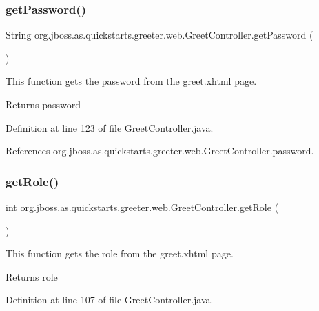 \subsubsection{\texorpdfstring{get\+Password()}{getPassword()}}
{\footnotesize\ttfamily String org.\+jboss.\+as.\+quickstarts.\+greeter.\+web.\+Greet\+Controller.\+get\+Password (\begin{DoxyParamCaption}{ }\end{DoxyParamCaption})}



This function gets the password from the greet.\+xhtml page. 

\begin{DoxyReturn}{Returns}
password 
\end{DoxyReturn}


Definition at line 123 of file Greet\+Controller.\+java.



References org.\+jboss.\+as.\+quickstarts.\+greeter.\+web.\+Greet\+Controller.\+password.

\mbox{\label{classorg_1_1jboss_1_1as_1_1quickstarts_1_1greeter_1_1web_1_1_greet_controller_ad53e5e1baef170e9bdbb4c1cb71b012b}} 
\subsubsection{\texorpdfstring{get\+Role()}{getRole()}}
{\footnotesize\ttfamily int org.\+jboss.\+as.\+quickstarts.\+greeter.\+web.\+Greet\+Controller.\+get\+Role (\begin{DoxyParamCaption}{ }\end{DoxyParamCaption})}



This function gets the role from the greet.\+xhtml page. 

\begin{DoxyReturn}{Returns}
role 
\end{DoxyReturn}


Definition at line 107 of file Greet\+Controller.\+java.



